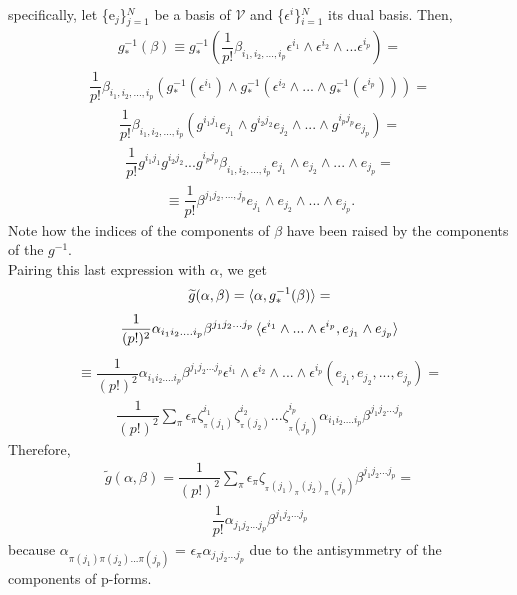 \documentclass[12pt,a4paper]{article}
\begin{document}
specifically, let \{e$_j$\}$^N_{j=1}$  be a basis of $\mathcal{V}$ and \{$\epsilon$$^i$\}$^N_{i=1}$ its dual basis. Then,
\begin{align*}
g_*^{-1} (\beta) \equiv g_*^{-1} ( \dfrac{1}{p!} \beta_{i_1, i_2,...,i_p} \epsilon^{i_1} \wedge \epsilon^{i_2} \wedge ... \epsilon^{i_p} ) =
\end{align*}
\begin{align*}
\dfrac{1}{p!} \beta_{i_1, i_2,...,i_p} (g_*^{-1}(\epsilon^{i_1}) \wedge g_*^{-1} (\epsilon^{i_2} \wedge ... \wedge g_*^{-1} (\epsilon^{i_p})))=
\end{align*}
\begin{align*}
\dfrac{1}{p!} \beta_{i_1, i_2,...,i_p} ( g^{i_1 j_1} e_{j_1} \wedge g^{i_2 j_2} e_{j_2} \wedge ... \wedge g^{i_p j_p} e_{j_p})=
\end{align*}
\begin{align*}
\dfrac{1}{p!} g^{i_1 j_1} g^{i_2 j_2} ... g^{i_p j_p}  \beta_{i_1, i_2,...,i_p} e_{j_1} \wedge e_{j_2} \wedge ... \wedge e_{j_p} =
\end{align*}
\begin{align*}
\equiv \dfrac{1}{p!} \beta^{j_1 j_2, ... , j_p}  e_{j_1} \wedge e_{j_2} \wedge ... \wedge e_{j_p} .
\end{align*}
Note how the indices of the components of $\beta$ have been raised by the components of the $g^{-1}$. \\Pairing this last expression with $\alpha$, we get
\begin{align*}
\widetilde{g} (\alpha, \beta) = \braket{\alpha, g_*^{-1}(\beta)}=
\end{align*}
\begin{align*}
\dfrac{1}{(p!)^2} \alpha_{i_1 i_2 .... i_p} \beta^{j_1 j_2 ... j_p} \braket{ \epsilon^{i_1} \wedge ... \wedge \epsilon^{i_p}, e_{j_1} \wedge e_{j_p}}  
\end{align*}
\begin{align*}
\equiv \dfrac{1}{(p!)^2} \alpha_{i_1 i_2 .... i_p} \beta^{j_1 j_2 ... j_p}  \epsilon^{i_1} \wedge \epsilon^{i_2} \wedge ... \wedge \epsilon^{i_p} (e_{j_1}, e_{j_2}, ..., e_{j_p})    =   
\end{align*}
\begin{align*}
 \dfrac{1}{(p!)^2} \sum_\pi \epsilon_\pi \zeta^{i_1}_{_\pi(j_1)} \zeta^{i_2}_{_\pi(j_2)} ... \zeta^{i_p}_{_\pi(j_p)} \alpha_{i_1 i_2 .... i_p} \beta^{j_1 j_2 ... j_p}
\end{align*}
Therefore,
\begin{align*}
\widetilde{g} (\alpha, \beta) =  \dfrac{1}{(p!)^2} \sum_\pi \epsilon_\pi \zeta_{_\pi(j_1) _\pi(j_2)_\pi(j_p)} \beta^{j_1 j_2 ... j_p}=
\end{align*}
\begin{align*}
\dfrac{1}{p!} \alpha_{j_1 j_2... j_p} \beta^{j_1 j_2 ... j_p}
\end{align*}
because $\alpha_{\pi (j_1) \pi (j_2) ... \pi (j_p)}$ = $\epsilon_\pi \alpha_{j_1 j_2 ... j_p}$ due to the antisymmetry of the components of p-forms.\\\\
\end{document}
